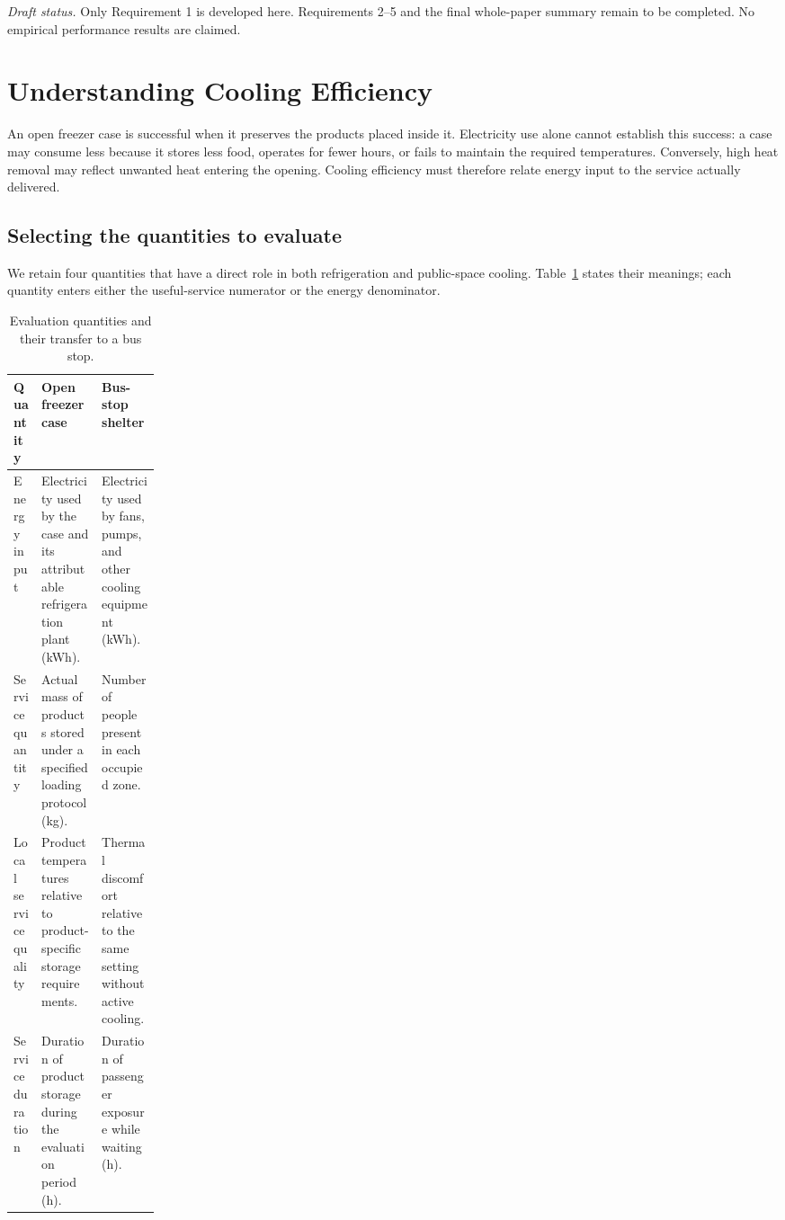 \documentclass[12pt]{article}
\begin{document}
\medskip
\noindent\textit{Draft status.} Only Requirement 1 is developed here. Requirements 2--5 and the final whole-paper summary remain to be completed. No empirical performance results are claimed.

\clearpage
\pagestyle{fancy}
\tableofcontents
\clearpage

\section{Understanding Cooling Efficiency}
\label{sec:understand}

An open freezer case is successful when it preserves the products placed inside it. Electricity use alone cannot establish this success: a case may consume less because it stores less food, operates for fewer hours, or fails to maintain the required temperatures. Conversely, high heat removal may reflect unwanted heat entering the opening. Cooling efficiency must therefore relate energy input to the service actually delivered.

\subsection{Selecting the quantities to evaluate}

We retain four quantities that have a direct role in both refrigeration and public-space cooling. Table~\ref{tab:service} states their meanings; each quantity enters either the useful-service numerator or the energy denominator.

\begin{table}[!ht]
\centering
\caption{Evaluation quantities and their transfer to a bus stop.}
\label{tab:service}
\small
\renewcommand{\arraystretch}{1.18}
\begin{tabularx}{\linewidth}{@{}>{\raggedright\arraybackslash}p{0.19\linewidth}
>{\raggedright\arraybackslash}X >{\raggedright\arraybackslash}X@{}}
\toprule
Quantity & Open freezer case & Bus-stop shelter\\
\midrule
Energy input & Electricity used by the case and its attributable refrigeration plant (kWh). & Electricity used by fans, pumps, and other cooling equipment (kWh).\\
Service quantity & Actual mass of products stored under a specified loading protocol (kg). & Number of people present in each occupied zone.\\
Local service quality & Product temperatures relative to product-specific storage requirements. & Thermal discomfort relative to the same setting without active cooling.\\
Service duration & Duration of product storage during the evaluation period (h). & Duration of passenger exposure while waiting (h).\\
\bottomrule
\end{tabularx}
\end{table}
\end{document}
